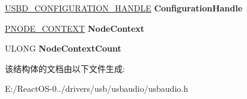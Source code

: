 \begin{DoxyCompactItemize}
\hyperlink{interfacevoid}{U\+S\+B\+D\+\_\+\+C\+O\+N\+F\+I\+G\+U\+R\+A\+T\+I\+O\+N\+\_\+\+H\+A\+N\+D\+LE} {\bfseries Configuration\+Handle}
\item 
\mbox{\label{struct_____d_e_v_i_c_e___e_x_t_e_n_s_i_o_n_____a132410da99c73d46110f201bdf2e4c74}} 
\hyperlink{struct_n_o_d_e___c_o_n_t_e_x_t}{P\+N\+O\+D\+E\+\_\+\+C\+O\+N\+T\+E\+XT} {\bfseries Node\+Context}
\item 
\mbox{\label{struct_____d_e_v_i_c_e___e_x_t_e_n_s_i_o_n_____a4c6608f947d4df5f5a7e1da47342f242}} 
U\+L\+O\+NG {\bfseries Node\+Context\+Count}
\end{DoxyCompactItemize}


该结构体的文档由以下文件生成\+:\begin{DoxyCompactItemize}
\item 
E\+:/\+React\+O\+S-\/0../drivers/usb/usbaudio/usbaudio.\+h\end{DoxyCompactItemize}
